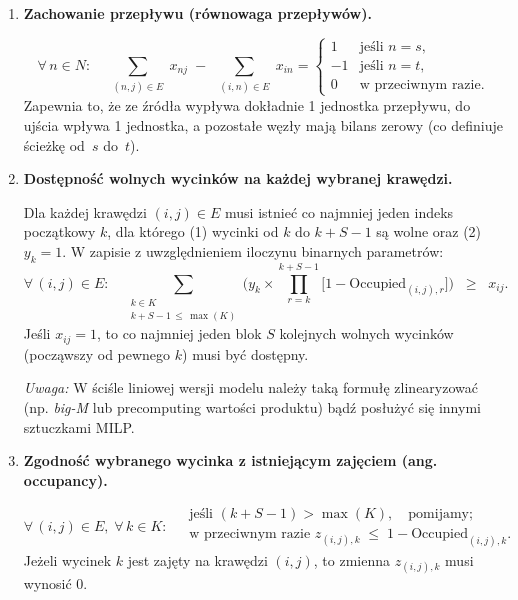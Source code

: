 \documentclass[12pt]{article}
\begin{document}
\begin{enumerate}
	\item \textbf{Zachowanie przepływu (równowaga przepływów).}

	      \[
		      \forall\, n \in N: \quad
		      \sum_{\substack{(n,j)\in E}} x_{n j}
		      \;-\;
		      \sum_{\substack{(i,n)\in E}} x_{i n}
		      =
		      \begin{cases}
			      1  & \text{jeśli } n = s,       \\
			      -1 & \text{jeśli } n = t,       \\
			      0  & \text{w przeciwnym razie}.
		      \end{cases}
	      \]
	      Zapewnia to, że ze źródła wypływa dokładnie 1 jednostka przepływu, do ujścia wpływa 1 jednostka, a pozostałe węzły mają bilans zerowy (co definiuje ścieżkę od \(\,s\) do \(\,t\)).

	      \vspace{1em}

	\item \textbf{Dostępność wolnych wycinków na każdej wybranej krawędzi.}

	      Dla każdej krawędzi \((i,j)\in E\) musi istnieć co najmniej jeden indeks początkowy \(k\), dla którego (1) wycinki od \(k\) do \(k+S-1\) są wolne oraz (2) \(y_k=1\). W zapisie z uwzględnieniem iloczynu binarnych parametrów:
	      \[
		      \forall\,(i,j) \in E:\quad
		      \sum_{\substack{k \in K \\ k + S - 1 \,\le\, \max(K)}}
		      \Biggl(
		      y_k \times
		      \prod_{r = k}^{k + S - 1} \bigl[1 - \text{Occupied}_{(i,j),r}\bigr]
		      \Biggr)
		      \;\;\ge\;\; x_{ij}.
	      \]
	      Jeśli \(x_{ij} = 1\), to co najmniej jeden blok \(S\) kolejnych wolnych wycinków (począwszy od pewnego \(k\)) musi być dostępny.

	      \emph{Uwaga:} W ściśle liniowej wersji modelu należy taką formułę zlinearyzować (np. \emph{big-M} lub precomputing wartości produktu) bądź posłużyć się innymi sztuczkami MILP.

	      \vspace{1em}

	\item \textbf{Zgodność wybranego wycinka z istniejącym zajęciem (ang. occupancy).}

	      \[
		      \forall\,(i,j)\in E,\;\forall\,k \in K: \;
		      \begin{aligned}
			       & \text{jeśli }(k + S - 1) > \max(K),\quad \text{pomijamy;}                     \\
			       & \text{w przeciwnym razie } z_{(i,j),k} \;\le\; 1 - \text{Occupied}_{(i,j),k}.
		      \end{aligned}
	      \]
	      Jeżeli wycinek \(k\) jest zajęty na krawędzi \((i,j)\), to zmienna \(z_{(i,j),k}\) musi wynosić 0.


\end{enumerate}
\end{document}

